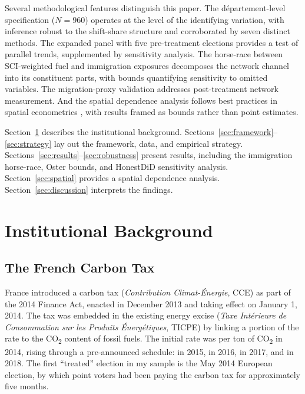 \documentclass[12pt]{article}
\providecommand{\euro}{\texteuro}
\newcommand{\dept}{d\'{e}partement}
\begin{document}
Several methodological features distinguish this paper. The \dept{}-level specification ($N = 960$) operates at the level of the identifying variation, with inference robust to the shift-share structure \citep{adao2019shift} and corroborated by seven distinct methods. The expanded panel with five pre-treatment elections provides a test of parallel trends, supplemented by \citet{rambachan2023more} sensitivity analysis. The horse-race between SCI-weighted fuel and immigration exposures decomposes the network channel into its constituent parts, with \citet{oster2019unobservable} bounds quantifying sensitivity to omitted variables. The migration-proxy validation addresses post-treatment network measurement. And the spatial dependence analysis follows best practices in spatial econometrics \citep{lesage2009introduction, anselin1988spatial}, with results framed as bounds rather than point estimates.

Section~\ref{sec:background} describes the institutional background. Sections~\ref{sec:framework}--\ref{sec:strategy} lay out the framework, data, and empirical strategy. Sections~\ref{sec:results}--\ref{sec:robustness} present results, including the immigration horse-race, Oster bounds, and HonestDiD sensitivity analysis. Section~\ref{sec:spatial} provides a spatial dependence analysis. Section~\ref{sec:discussion} interprets the findings.



\section{Institutional Background}
\label{sec:background}

\subsection{The French Carbon Tax}

France introduced a carbon tax (\textit{Contribution Climat-\'{E}nergie}, CCE) as part of the 2014 Finance Act, enacted in December 2013 and taking effect on January 1, 2014. The tax was embedded in the existing energy excise (\textit{Taxe Int\'{e}rieure de Consommation sur les Produits \'{E}nerg\'{e}tiques}, TICPE) by linking a portion of the rate to the CO\textsubscript{2} content of fossil fuels. The initial rate was \euro 7 per ton of CO\textsubscript{2} in 2014, rising through a pre-announced schedule: \euro 14.50 in 2015, \euro 22 in 2016, \euro 30.50 in 2017, and \euro 44.60 in 2018. The first ``treated'' election in my sample is the May 2014 European election, by which point voters had been paying the carbon tax for approximately five months.
\end{document}

